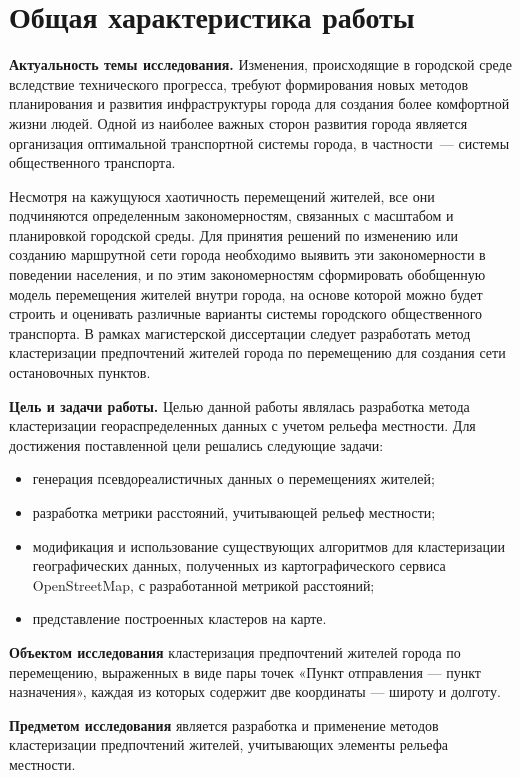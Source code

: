 \section{Общая характеристика работы}
\textbf{Актуальность темы исследования.} Изменения, происходящие в городской среде вследствие технического прогресса, требуют формирования новых методов планирования и развития инфраструктуры города для создания более комфортной жизни людей. Одной из наиболее важных сторон развития города является организация оптимальной транспортной системы города, в частности~--- системы общественного транспорта.

Несмотря на кажущуюся хаотичность перемещений жителей, все они подчиняются определенным закономерностям, связанных с масштабом и планировкой городской среды. Для принятия решений по изменению или созданию маршрутной сети города необходимо выявить эти закономерности в поведении населения, и по этим закономерностям сформировать обобщенную модель перемещения жителей внутри города, на основе которой можно будет строить и оценивать различные варианты системы городского общественного транспорта. В рамках магистерской диссертации следует разработать метод кластеризации предпочтений жителей города по перемещению для создания сети остановочных пунктов.

\textbf{Цель и задачи работы.} Целью данной работы являлась разработка метода кластеризации геораспределенных данных с учетом рельефа местности. Для достижения 
поставленной цели решались следующие задачи:
\begin{itemize}
    \item генерация псевдореалистичных данных о перемещениях жителей;
    \item разработка метрики расстояний, учитывающей рельеф местности;
    \item модификация и использование существующих алгоритмов для кластеризации географических данных, полученных из картографического сервиса OpenStreetMap, с разработанной метрикой расстояний;
    \item представление построенных кластеров на карте.
\end{itemize}

\textbf{Объектом исследования} кластеризация предпочтений жителей города по перемещению, выраженных в виде пары точек «Пункт отправления — пункт назначения», каждая из которых содержит две координаты — широту и долготу.

\textbf{Предметом исследования} является разработка и применение методов кластеризации предпочтений жителей, учитывающих элементы рельефа местности.

